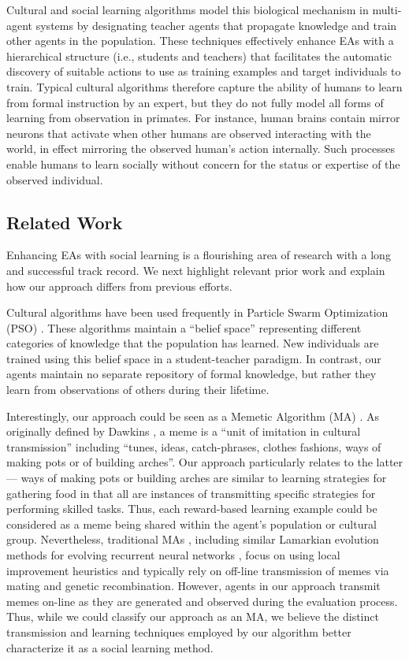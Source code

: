 \documentclass{acm_proc_article-sp}
\begin{document}
Cultural and social learning algorithms \cite{reynolds1994introduction} model this biological mechanism in multi-agent systems by designating teacher agents that propagate knowledge and train other agents in the population. These techniques effectively enhance EAs with a hierarchical structure (i.e., students and teachers) that facilitates the automatic discovery of suitable actions to use as training examples and target individuals to train. Typical cultural algorithms therefore capture the ability of humans to learn from formal instruction by an expert, but they do not fully model all forms of learning from observation in primates. For instance, human brains contain mirror neurons \cite{gallese-98} that activate when other humans are observed interacting with the world, in effect mirroring the observed human's action internally. Such processes enable humans to learn socially without concern for the status or expertise of the observed individual.

\subsection*{Related Work}

Enhancing EAs with social learning is a flourishing area of research with a long and successful track record. We next highlight relevant prior work and explain how our approach differs from previous efforts.

Cultural algorithms \cite{reynolds1994introduction} have been used frequently in Particle Swarm Optimization (PSO) \cite{kennedy1995particle}. These algorithms maintain a ``belief space'' representing different categories of knowledge that the population has learned. New individuals are trained using this belief space in a student-teacher paradigm. In contrast, our agents maintain no separate repository of formal knowledge, but rather they learn from observations of others during their lifetime.

Interestingly, our approach could be seen as a Memetic Algorithm (MA) \cite{moscato1989evolution}. As originally defined by Dawkins \cite{dawkins2006selfish}, a meme is a ``unit of imitation in cultural transmission'' including ``tunes, ideas, catch-phrases, clothes fashions, ways of making pots or of building arches''. Our approach particularly relates to the latter--- ways of making pots or building arches are similar to learning strategies for gathering food in that all are instances of transmitting specific strategies for performing skilled tasks. Thus, each reward-based learning example could be considered as a meme being shared within the agent's population or cultural group. Nevertheless, traditional MAs \cite{onwubolu2004new}, including similar Lamarkian evolution methods for evolving recurrent neural networks \cite{ku2000study}, focus on using local improvement heuristics and typically rely on off-line transmission of memes via mating and genetic recombination. However, agents in our approach transmit memes on-line as they are generated and observed during the evaluation process. Thus, while we could classify our approach as an MA, we believe the distinct transmission and learning techniques employed by our algorithm better characterize it as a social learning method.
\end{document}

